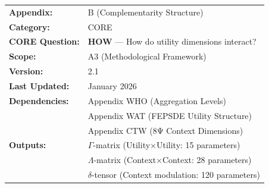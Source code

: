 %
% 
%
%
%


\begin{tcolorbox}[colback=red!5!white, colframe=red!75!black, 
    title=\textbf{CORE Appendix: Complementarity Structure}]

\begin{tabular}{@{}ll@{}}
\textbf{Appendix:} & B (Complementarity Structure) \\
\textbf{Category:} & CORE \\
\textbf{CORE Question:} & \textbf{HOW} --- How do utility dimensions interact? \\
\textbf{Scope:} & A3 (Methodological Framework) \\
\textbf{Version:} & 2.1 \\
\textbf{Last Updated:} & January 2026 \\
\textbf{Dependencies:} & Appendix WHO (Aggregation Levels) \\
 & Appendix WAT (FEPSDE Utility Structure) \\
 & Appendix CTW (8Ψ Context Dimensions) \\
\textbf{Outputs:} & $\Gamma$-matrix (Utility$\times$Utility: 15 parameters) \\
 & $\Lambda$-matrix (Context$\times$Context: 28 parameters) \\
 & $\delta$-tensor (Context modulation: 120 parameters) \\
\end{tabular}

\end{tcolorbox}


